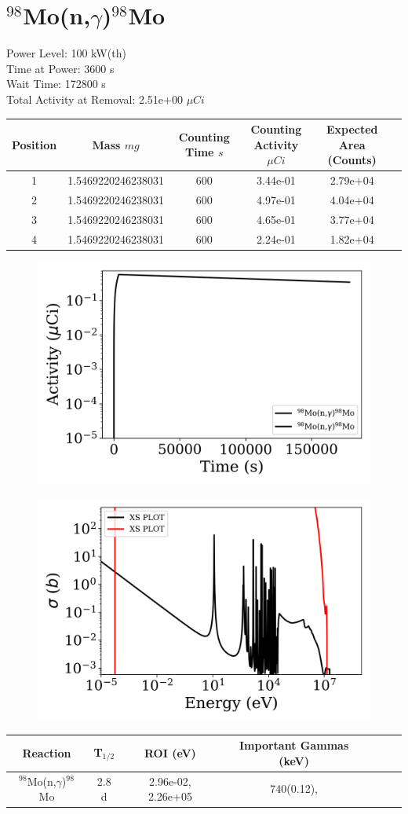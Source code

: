 \newpage

\section*{ $^{98}$Mo(n,$\gamma$)$^{98}$Mo }

Power Level: 100 kW(th) \\
Time at Power: 3600 s \\
Wait Time: 172800 s \\
Total Activity at Removal: 2.51e+00 $\mu Ci$

\begin{table}[h]
\centering
\begin{tabular}{ |c|c|c|c|c|c| }
 \hline
 Position & Mass $mg$ & Counting Time $s$ & Counting Activity $\mu Ci$ & Expected Area (Counts) \\
 \hline 
 1 & 1.5469220246238031 & 600 & 3.44e-01 & 2.79e+04\\ 
\hline
 2 & 1.5469220246238031 & 600 & 4.97e-01 & 4.04e+04\\ 
\hline
 3 & 1.5469220246238031 & 600 & 4.65e-01 & 3.77e+04\\ 
\hline
 4 & 1.5469220246238031 & 600 & 2.24e-01 & 1.82e+04\\ 
\hline
\end{tabular}
\end{table}

\begin{figure}[!ht]
   \centering
   \includegraphics[width=.4\textwidth]{source/plot/Mo-98(n,gamma)Mo-98_wisconsin1.png} 

\end{figure}

\begin{figure}[!ht]
   \centering
   \includegraphics[width=.4\textwidth]{source/plot/Mo-98(n,gamma)Mo-98.png} 

\end{figure}

\begin{table}[h]
\centering
\begin{tabular}{ |c|c|c|c|c|c|c| }
 \hline
 Reaction & T$_{1/2}$ & ROI (eV) & Important Gammas (keV) \\
 \hline 
 $^{98}$Mo(n,$\gamma$)$^{98}$Mo &  2.8 d & 2.96e-02, 2.26e+05 & 740(0.12),  \\ 
\hline
\end{tabular}
\end{table}
